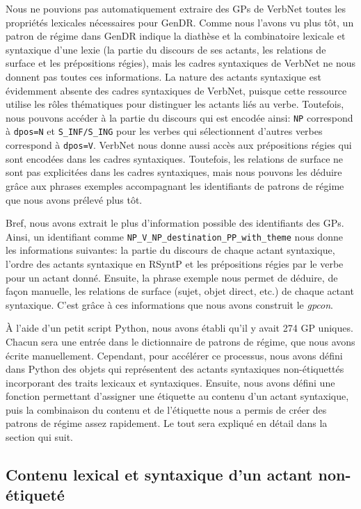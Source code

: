 Nous ne pouvions pas automatiquement extraire des \acp{GP} de VerbNet toutes les propriétés lexicales nécessaires pour GenDR. Comme nous l'avons vu plus tôt, un patron de régime dans GenDR indique la diathèse et la combinatoire lexicale et syntaxique d'une lexie (la partie du discours de ses actants, les relations de surface et les prépositions régies), mais les cadres syntaxiques de VerbNet ne nous donnent pas toutes ces informations. La nature des actants syntaxique est évidemment absente des cadres syntaxiques de VerbNet, puisque cette ressource utilise les rôles thématiques pour distinguer les actants liés au verbe. Toutefois, nous pouvons accéder à la partie du discours qui est encodée ainsi: \texttt{NP} correspond à \texttt{dpos=N} et \texttt{S\_INF/S\_ING} pour les verbes qui sélectionnent d'autres verbes correspond à \texttt{dpos=V}. VerbNet nous donne aussi accès aux prépositions régies qui sont encodées dans les cadres syntaxiques. Toutefois, les relations de surface ne sont pas explicitées dans les cadres syntaxiques, mais nous pouvons les déduire grâce aux phrases exemples accompagnant les identifiants de patrons de régime que nous avons prélevé plus tôt.

Bref, nous avons extrait le plus d'information possible des identifiants des \acp{GP}. Ainsi, un identifiant comme \texttt{NP\_V\_NP\_destination\_PP\_with\_theme} nous donne les informations suivantes: la partie du discours de chaque actant syntaxique, l'ordre des actants syntaxique en \ac{RSyntP} et les prépositions régies par le verbe pour un actant donné. Ensuite, la phrase exemple  nous permet de déduire, de façon manuelle, les relations de surface (sujet, objet direct, etc.) de chaque actant syntaxique. C'est grâce à ces informations que nous avons construit le \emph{gpcon}.

À l'aide d'un petit script Python, nous avons établi qu'il y avait 274 \ac{GP} uniques. Chacun sera une entrée dans le dictionnaire de patrons de régime, que nous avons écrite manuellement. Cependant, pour accélérer ce processus, nous avons défini dans Python des objets qui représentent des actants syntaxiques non-étiquettés incorporant des traits lexicaux et syntaxiques. Ensuite, nous avons défini une fonction permettant d'assigner une étiquette au contenu d'un actant syntaxique, puis la combinaison du contenu et de l'étiquette nous a permis de créer des patrons de régime assez rapidement. Le tout sera expliqué en détail dans la section qui suit.

\subsection{Contenu lexical et syntaxique d'un actant non-étiqueté}

